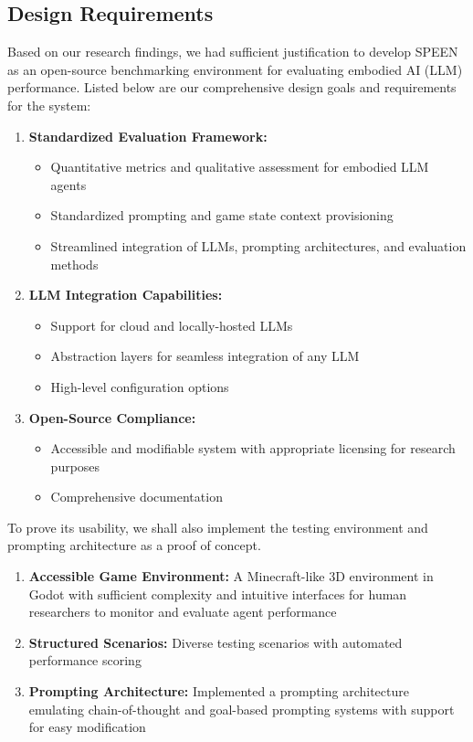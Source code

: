 \documentclass{article}
\begin{document}
\subsection{Design Requirements}
Based on our research findings, we had sufficient justification to develop SPEEN as an open-source benchmarking environment for evaluating embodied AI (LLM) performance.
Listed below are our comprehensive design goals and requirements for the system:
\begin{enumerate}[noitemsep,topsep=0pt]
    \item \textbf{Standardized Evaluation Framework:}
          \begin{itemize}[noitemsep,topsep=0pt]
              \item Quantitative metrics and qualitative assessment for embodied LLM agents
              \item Standardized prompting and game state context provisioning
              \item Streamlined integration of LLMs, prompting architectures, and evaluation methods
          \end{itemize}
    \item \textbf{LLM Integration Capabilities:}
          \begin{itemize}[noitemsep,topsep=0pt]
              \item Support for cloud and locally-hosted LLMs
              \item Abstraction layers for seamless integration of any LLM
              \item High-level configuration options
          \end{itemize}
    \item \textbf{Open-Source Compliance:}
          \begin{itemize}[noitemsep,topsep=0pt]
              \item Accessible and modifiable system with appropriate licensing for research purposes
              \item Comprehensive documentation
          \end{itemize}
\end{enumerate}
\vspace{-0.5em}
To prove its usability, we shall also implement the testing environment and prompting architecture as a proof of concept.
\begin{enumerate}[noitemsep]
    \item \textbf{Accessible Game Environment:} A Minecraft-like 3D environment in Godot with sufficient complexity and intuitive interfaces for human researchers to monitor and evaluate agent performance
    \item \textbf{Structured Scenarios:} Diverse testing scenarios with automated performance scoring
    \item \textbf{Prompting Architecture:} Implemented a prompting architecture emulating chain-of-thought and goal-based prompting systems with support for easy modification
\end{enumerate}
\end{document}
